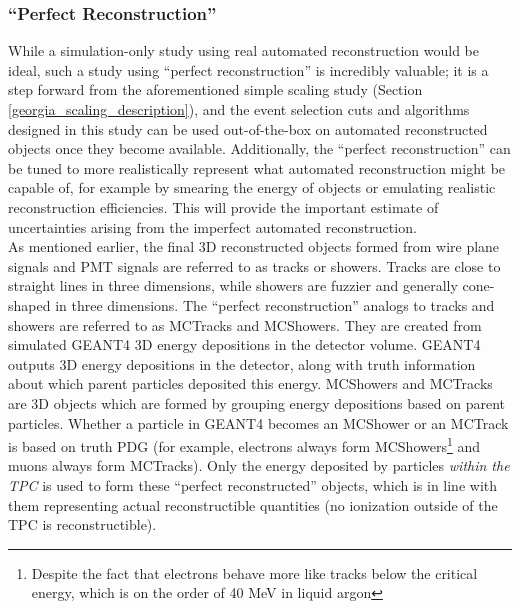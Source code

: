 \subsubsection{``Perfect Reconstruction''}\label{perfectreco_section}
While a simulation-only study using real automated reconstruction would be ideal, such a study using ``perfect reconstruction'' is incredibly valuable; it is a step forward from the aforementioned simple scaling study (Section \ref{georgia_scaling_description}), and the event selection cuts and algorithms designed in this study can be used out-of-the-box on automated reconstructed objects once they become available. Additionally, the ``perfect reconstruction'' can be tuned to more realistically represent what automated reconstruction might be capable of, for example by smearing the energy of objects or emulating realistic reconstruction efficiencies. This will provide the important estimate of uncertainties arising from the imperfect automated reconstruction.\\

As mentioned earlier, the final 3D reconstructed objects formed from wire plane signals and PMT signals are referred to as tracks or showers. Tracks are close to straight lines in three dimensions, while showers are fuzzier and generally cone-shaped in three dimensions. The ``perfect reconstruction'' analogs to tracks and showers are referred to as {\sc MCTracks} and {\sc MCShowers}. They are created from simulated {\sc GEANT4} 3D energy depositions in the detector volume. {\sc GEANT4} outputs 3D energy depositions in the detector, along with truth information about which parent particles deposited this energy. {\sc MCShowers} and {\sc MCTracks} are 3D objects which are formed by grouping energy depositions based on parent particles. Whether a particle in {\sc GEANT4} becomes an {\sc MCShower} or an {\sc MCTrack} is based on truth PDG (for example, electrons always form {\sc MCShower}s\footnote{Despite the fact that electrons behave more like tracks below the critical energy, which is on the order of 40 MeV in liquid argon} and muons always form {\sc MCTrack}s). Only the energy deposited by particles \textit{within the TPC} is used to form these ``perfect reconstructed'' objects, which is in line with them representing actual reconstructible quantities (no ionization outside of the TPC is reconstructible).\\

